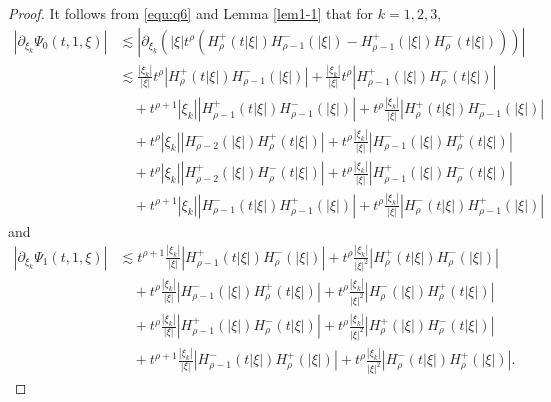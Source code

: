 \documentclass[11pt,twoside]{article}
\newcommand{\f}{\frac}
\theoremstyle{plain}
\theoremstyle{definition}
\theoremstyle{remark}
\numberwithin{equation}{section}
\begin{document}
\begin{proof}
It follows from \eqref{equ:q6} and Lemma \ref{lem1-1}  that for $k=1,2,3$,
\begin{equation}\label{e:q36}
\begin{aligned}
\left| \partial_{\xi_k} \Psi_0(t, 1, \xi) \right|
&\lesssim \left| \partial_{\xi_k} \left( |\xi| t^\rho \left( H_\rho^+(t|\xi|) H_{\rho-1}^-(|\xi|)
- H_{\rho-1}^+(|\xi|) H_\rho^-(t|\xi|) \right) \right) \right| \\
&\lesssim \frac{|\xi_k|}{|\xi|} t^\rho \left| H_\rho^+(t|\xi|) H_{\rho-1}^-(|\xi|) \right|
+ \frac{|\xi_k|}{|\xi|} t^\rho \left| H_{\rho-1}^+(|\xi|) H_\rho^-(t|\xi|) \right| \\
&\quad + t^{\rho+1} |\xi_k| \left| H_{\rho-1}^+(t|\xi|) H_{\rho-1}^-(|\xi|) \right|
+ t^\rho \frac{|\xi_k|}{|\xi|} \left| H_\rho^+(t|\xi|) H_{\rho-1}^-(|\xi|) \right| \\
&\quad + t^\rho |\xi_k| \left| H_{\rho-2}^-(|\xi|) H_\rho^+(t|\xi|) \right|
+ t^\rho \frac{|\xi_k|}{|\xi|} \left| H_{\rho-1}^-(|\xi|) H_\rho^+(t|\xi|) \right| \\
&\quad + t^\rho |\xi_k| \left| H_{\rho-2}^+(|\xi|) H_\rho^-(t|\xi|) \right|
+ t^\rho \frac{|\xi_k|}{|\xi|} \left| H_{\rho-1}^+(|\xi|) H_\rho^-(t|\xi|) \right| \\
&\quad + t^{\rho+1} |\xi_k| \left| H_{\rho-1}^-(t|\xi|) H_{\rho-1}^+(|\xi|) \right|
+ t^\rho \frac{|\xi_k|}{|\xi|} \left| H_\rho^-(t|\xi|) H_{\rho-1}^+(|\xi|) \right|
\end{aligned}
\end{equation}
and
\begin{equation}\label{e:q37}
\begin{aligned}
\left| \partial_{\xi_k} \Psi_1(t, 1, \xi) \right|
&\lesssim  t^{\rho+1} \f{|\xi_k|}{|\xi|} \left| H_{\rho-1}^+(t|\xi|) H_{\rho}^-(|\xi|) \right|
+ t^\rho \frac{|\xi_k|}{|\xi|^2} \left| H_\rho^+(t|\xi|) H_{\rho}^-(|\xi|) \right| \\
&\quad + t^\rho \f{|\xi_k|}{|\xi|} \left| H_{\rho-1}^-(|\xi|) H_\rho^+(t|\xi|) \right|
+ t^\rho \frac{|\xi_k|}{|\xi|^2} \left| H_{\rho}^-(|\xi|) H_\rho^+(t|\xi|) \right| \\
&\quad + t^\rho \f{|\xi_k|}{|\xi|} \left| H_{\rho-1}^+(|\xi|) H_\rho^-(t|\xi|) \right|
+ t^\rho \frac{|\xi_k|}{|\xi|^2} \left| H_{\rho}^+(|\xi|) H_\rho^-(t|\xi|) \right| \\
&\quad + t^{\rho+1} \f{|\xi_k|}{|\xi|} \left| H_{\rho-1}^-(t|\xi|) H_{\rho}^+(|\xi|) \right|
+ t^\rho \frac{|\xi_k|}{|\xi|^2} \left| H_\rho^-(t|\xi|) H_{\rho}^+(|\xi|) \right|.
\end{aligned}

\end{equation}
\end{proof}
\end{document}
